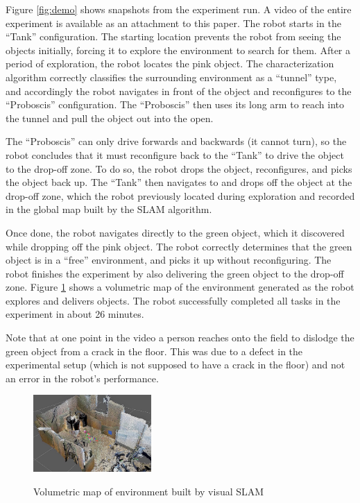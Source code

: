 \documentclass[journal]{IEEEtran}
\begin{document}
%
Figure \ref{fig:demo} shows snapshots from the experiment run. A video of the entire experiment is available as an attachment to this paper. The robot starts in the ``Tank'' configuration. The starting location prevents the robot from seeing the objects initially, forcing it to explore the environment to search for them. After a period of exploration, the robot locates the pink object. The characterization algorithm correctly classifies the surrounding environment as a ``tunnel'' type, and accordingly the robot navigates in front of the object and reconfigures to the ``Proboscis'' configuration. The ``Proboscis'' then uses its long arm to reach into the tunnel and pull the object out into the open.

 The ``Proboscis'' can only drive forwards and backwards (it cannot turn), so the robot concludes that it must reconfigure back to the ``Tank'' to drive the object to the drop-off zone.  To do so, the robot drops the object, reconfigures, and picks the object back up. The ``Tank'' then navigates to and drops off the object at the drop-off zone, which the robot previously located during exploration and recorded in the global map built by the SLAM algorithm.

 Once done, the robot navigates directly to the green object, which it discovered while dropping off the pink object. The robot correctly determines
that the green object is in a ``free'' environment, and picks it up without reconfiguring. The robot finishes the experiment by also delivering the green object to the drop-off zone. Figure \ref{fig:octomap} shows a volumetric map of the environment generated as the robot explores and delivers objects. The robot successfully completed all tasks in the experiment in about 26 minutes. 

Note that at one point in the video a person reaches onto the field to dislodge the green object from a crack in the floor.  This was due to a defect in the experimental setup (which is not supposed to have a crack in the floor) and not an error in the robot's performance.
%
\begin{figure}
\begin{center}
\includegraphics[width=0.4\textwidth]{images/map4.jpg}
\caption{Volumetric map of environment built by visual SLAM}
\vspace{-2em}
\label{fig:octomap}
\end{center}
\end{figure}
\end{document}
